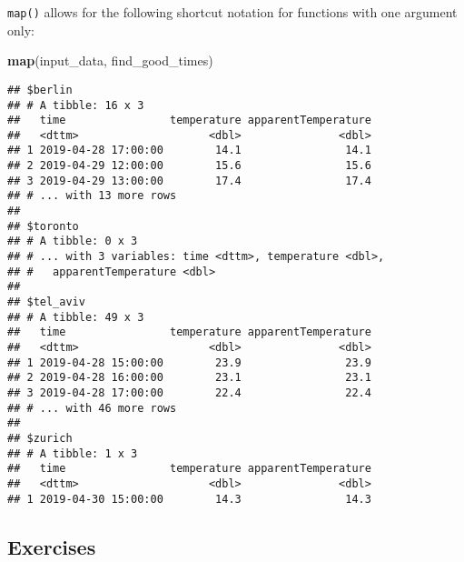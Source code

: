 \documentclass[]{book}
\newenvironment{Shaded}{\begin{snugshade}}{\end{snugshade}}
\newcommand{\KeywordTok}[1]{\textcolor[rgb]{0.13,0.29,0.53}{\textbf{#1}}}
\newcommand{\NormalTok}[1]{#1}
\begin{document}
\texttt{map()} allows for the following shortcut notation for functions with one argument only:

\begin{Shaded}
\begin{Highlighting}[]
\KeywordTok{map}\NormalTok{(input_data, find_good_times)}
\end{Highlighting}
\end{Shaded}

\begin{verbatim}
## $berlin
## # A tibble: 16 x 3
##   time                temperature apparentTemperature
##   <dttm>                    <dbl>               <dbl>
## 1 2019-04-28 17:00:00        14.1                14.1
## 2 2019-04-29 12:00:00        15.6                15.6
## 3 2019-04-29 13:00:00        17.4                17.4
## # ... with 13 more rows
## 
## $toronto
## # A tibble: 0 x 3
## # ... with 3 variables: time <dttm>, temperature <dbl>,
## #   apparentTemperature <dbl>
## 
## $tel_aviv
## # A tibble: 49 x 3
##   time                temperature apparentTemperature
##   <dttm>                    <dbl>               <dbl>
## 1 2019-04-28 15:00:00        23.9                23.9
## 2 2019-04-28 16:00:00        23.1                23.1
## 3 2019-04-28 17:00:00        22.4                22.4
## # ... with 46 more rows
## 
## $zurich
## # A tibble: 1 x 3
##   time                temperature apparentTemperature
##   <dttm>                    <dbl>               <dbl>
## 1 2019-04-30 15:00:00        14.3                14.3
\end{verbatim}

\hypertarget{exercises-11}{%
\subsection{Exercises}\label{exercises-11}}
\end{document}
